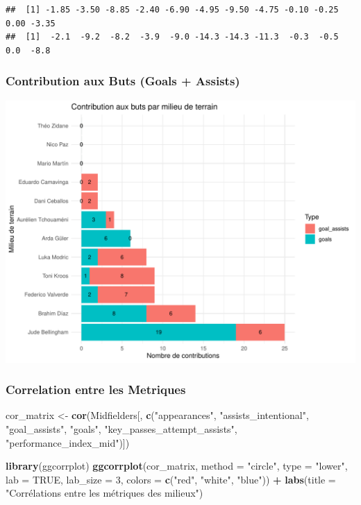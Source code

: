 \documentclass[
  6pt,
]{article}
\newenvironment{Shaded}{\begin{snugshade}}{\end{snugshade}}
\newcommand{\AttributeTok}[1]{\textcolor[rgb]{0.13,0.29,0.53}{#1}}
\newcommand{\ConstantTok}[1]{\textcolor[rgb]{0.56,0.35,0.01}{#1}}
\newcommand{\DecValTok}[1]{\textcolor[rgb]{0.00,0.00,0.81}{#1}}
\newcommand{\FunctionTok}[1]{\textcolor[rgb]{0.13,0.29,0.53}{\textbf{#1}}}
\newcommand{\NormalTok}[1]{#1}
\newcommand{\OtherTok}[1]{\textcolor[rgb]{0.56,0.35,0.01}{#1}}
\newcommand{\SpecialCharTok}[1]{\textcolor[rgb]{0.81,0.36,0.00}{\textbf{#1}}}
\newcommand{\StringTok}[1]{\textcolor[rgb]{0.31,0.60,0.02}{#1}}
\begin{document}
\begin{verbatim}
##  [1] -1.85 -3.50 -8.85 -2.40 -6.90 -4.95 -9.50 -4.75 -0.10 -0.25  0.00 -3.35
##  [1]  -2.1  -9.2  -8.2  -3.9  -9.0 -14.3 -14.3 -11.3  -0.3  -0.5   0.0  -8.8
\end{verbatim}

\subsubsection{Contribution aux Buts (Goals +
Assists)}\label{contribution-aux-buts-goals-assists}

\begin{center}\includegraphics[width=0.8\linewidth]{Analyse_Impact_Performances_Joueurs_files/figure-latex/Contribution buts et assits-mid-1} \end{center}

\subsubsection{Correlation entre les
Metriques}\label{correlation-entre-les-metriques}

\begin{Shaded}
\begin{Highlighting}[]
\NormalTok{cor\_matrix }\OtherTok{\textless{}{-}} \FunctionTok{cor}\NormalTok{(Midfielders[, }\FunctionTok{c}\NormalTok{(}\StringTok{"appearances"}\NormalTok{, }\StringTok{"assists\_intentional"}\NormalTok{, }\StringTok{"goal\_assists"}\NormalTok{, }\StringTok{"goals"}\NormalTok{, }
                                  \StringTok{"key\_passes\_attempt\_assists"}\NormalTok{, }\StringTok{"performance\_index\_mid"}\NormalTok{)])}


\FunctionTok{library}\NormalTok{(ggcorrplot)}
\FunctionTok{ggcorrplot}\NormalTok{(cor\_matrix, }\AttributeTok{method =} \StringTok{"circle"}\NormalTok{, }\AttributeTok{type =} \StringTok{"lower"}\NormalTok{, }\AttributeTok{lab =} \ConstantTok{TRUE}\NormalTok{, }\AttributeTok{lab\_size =} \DecValTok{3}\NormalTok{, }
           \AttributeTok{colors =} \FunctionTok{c}\NormalTok{(}\StringTok{"red"}\NormalTok{, }\StringTok{"white"}\NormalTok{, }\StringTok{"blue"}\NormalTok{)) }\SpecialCharTok{+}
  \FunctionTok{labs}\NormalTok{(}\AttributeTok{title =} \StringTok{"Corrélations entre les métriques des milieux"}\NormalTok{)}
\end{Highlighting}
\end{Shaded}
\end{document}
